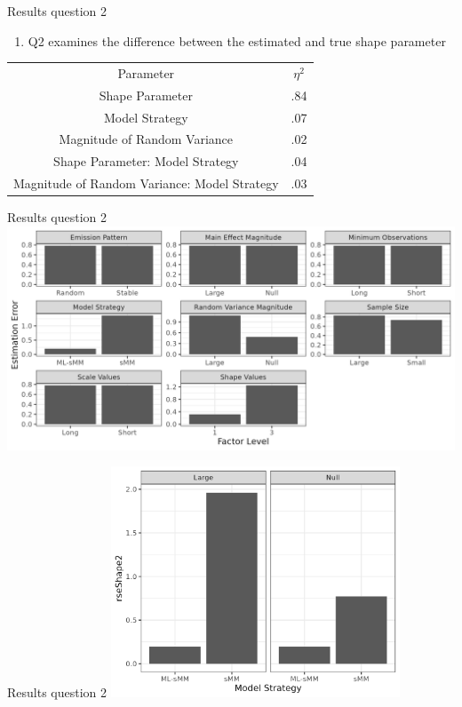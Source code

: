 \documentclass[
  ignorenonframetext,
]{beamer}
\providecommand{\tightlist}{%
  \setlength{\itemsep}{0pt}\setlength{\parskip}{0pt}}
\begin{document}
\begin{frame}{Results question 2}
\label{results-question-2}
\begin{enumerate}
\tightlist
\item
  Q2 examines the difference between the estimated and true shape
  parameter
\end{enumerate}

\begin{table}
    \centering
    \begin{tabular}{cc}
        Parameter & \(\eta^2\)\\
        Shape Parameter & .84 \\
        Model Strategy & .07 \\
        Magnitude of Random Variance & .02 \\
        Shape Parameter: Model Strategy & .04 \\
        Magnitude of Random Variance: Model Strategy & .03 \\
    \end{tabular}
\end{table}
\end{frame}

\begin{frame}{Results question 2}
\label{results-question-2-1}
\includegraphics{figures/anova2MainEffect.png}
\end{frame}

\begin{frame}{Results question 2}
\label{results-question-2-2}
\includegraphics[width=\textwidth,height=2.70833in]{figures/anova2TwoWay1.png}
\end{frame}
\end{document}
